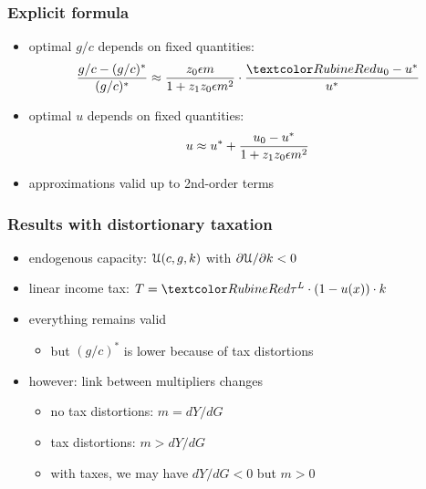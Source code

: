\documentclass[12pt,xcolor={dvipsnames},hyperref={pdftex,pdfpagemode=UseNone,hidelinks,pdfdisplaydoctitle=true},usepdftitle=false]{beamer}
\begin{document}
\begin{frame}
\frametitle{Explicit formula}
\begin{itemize}
\item optimal $g/c$ depends on fixed quantities:
\begin{equation*}
\frac{g/c-(g/c)^{*}}{(g/c)^{*}}\approx \frac{z_0\e m}{1+  z_1 z_0 \e m^{2}} \cdot \frac{\al{u_{0}}-u^{*}}{u^{*}}
\end{equation*}
\item optimal $u$ depends on fixed quantities:
\begin{equation*}
u\approx u^{*}+\frac{u_{0}-u^{*}}{1+ z_1 z_0 \epsilon m^{2}}
\end{equation*}
\item approximations valid up to 2nd-order terms
\end{itemize}
\end{frame}


\begin{frame}
\frametitle{Results with distortionary taxation}
\begin{itemize}
\item endogenous capacity: $\mathcal{U}(c,g,k)$ with $\partial \mathcal{U}/\partial k<0$
\item linear income tax: $T=\al{\tau^{L}}\cdot (1-u(x))\cdot k$
\item everything remains valid
\begin{itemize}
 \item but $(g/c)^{*}$ is lower because of tax distortions
 \end{itemize} 
\item however: link between multipliers changes
\begin{itemize}
\item no tax  distortions: $ m = dY/dG$
\item tax distortions:  $ m > dY/dG$
\item with taxes, we may have $dY/dG<0$ but $m>0$
\end{itemize}
\end{itemize}
\end{frame}


\begin{frame}
\end{frame}
\end{document}
